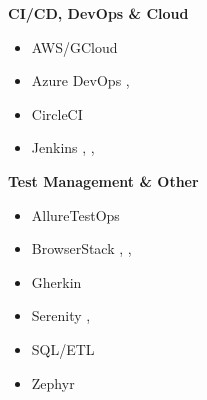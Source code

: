     \textbf{CI/CD, DevOps \& Cloud}
    \begin{multicols}{3}
    \small{
        \begin{itemize}[itemsep=0mm, topsep=0mm, parsep=0mm, partopsep=0mm]
            \item AWS/GCloud 
            \item Azure DevOps , 
            \item CircleCI 
            \item Jenkins , , 
        \end{itemize}
    }
    \end{multicols}
    
    \textbf{Test Management \& Other}
    \begin{multicols}{3}
    \small{
        \begin{itemize}[itemsep=0mm, topsep=0mm, parsep=0mm, partopsep=0mm]
            \item AllureTestOps 
            \item BrowserStack , , 
            \item Gherkin 
            \item Serenity , 
            \item SQL/ETL 
            \item Zephyr 
        \end{itemize}
    }
    \end{multicols}